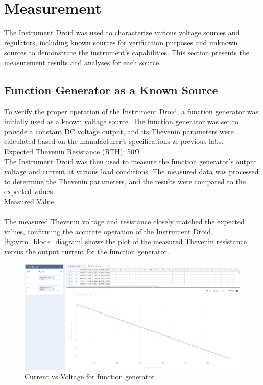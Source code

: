 \documentclass[a4paper,11pt]{article}%
\begin{document}
\section{Measurement}

The Instrument Droid was used to characterize various voltage sources and regulators, including known sources for verification purposes and unknown sources to demonstrate the instrument's capabilities. This section presents the measurement results and analyses for each source.

\subsection{Function Generator as a Known Source} 

To verify the proper operation of the Instrument Droid, a function generator was initially used as a known voltage source. The function generator was set to provide a constant DC voltage output, and its Thevenin parameters were calculated based on the manufacturer's specifications \& previous labs.\\

Expected Thevenin Resistance (RTH): 50$\ohm$\\

The Instrument Droid was then used to measure the function generator's output voltage and current at various load conditions. The measured data was processed to determine the Thevenin parameters, and the results were compared to the expected values.\\

Measured Value\\
\\
The measured Thevenin voltage and resistance closely matched the expected values, confirming the accurate operation of the Instrument Droid.\\

\ref{fig:vrm_block_diagram} shows the plot of the measured Thevenin resistance versus the output current for the function generator.\\

\begin{figure}[H]
	\centering
	\includegraphics[scale=0.30]{figures/function_generator.png}
  \caption{Current vs Voltage for function generator}
  \label{fig:function_generator}
\end{figure}
\end{document}

